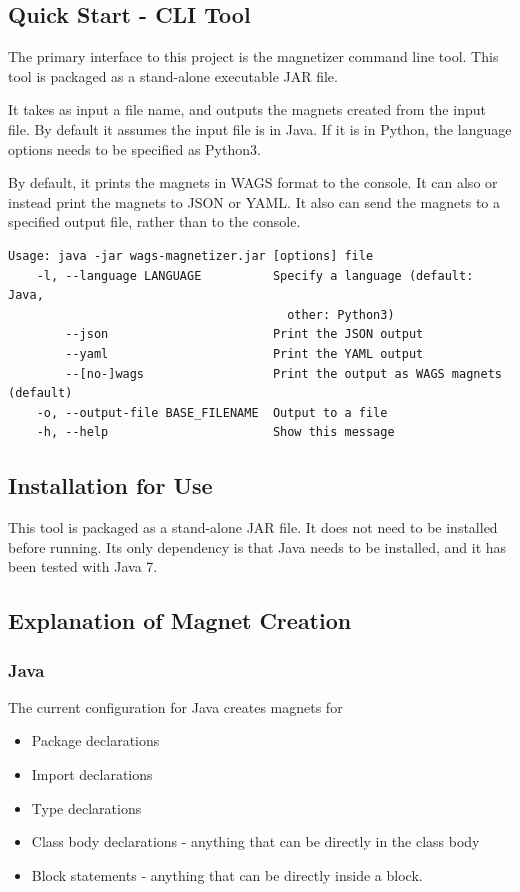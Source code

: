 \documentclass[letter,10pt,final]{article}
\begin{document}
\subsection{Quick Start - CLI Tool}

The primary interface to this project is the magnetizer command line 
tool.  This tool is packaged as a stand-alone executable JAR file. 

It takes as input a file name, and outputs the magnets created 
from the input file. By default it assumes the input file is in Java. 
If it is in Python, the language options needs to be specified as 
Python3. 

By default, it prints the magnets in WAGS format to the console. It can 
also or instead print the magnets to JSON or YAML. It also can 
send the magnets to a specified output file, rather than to the 
console. 

\begin{verbatim}
Usage: java -jar wags-magnetizer.jar [options] file
    -l, --language LANGUAGE          Specify a language (default: Java, 
                                       other: Python3)
        --json                       Print the JSON output
        --yaml                       Print the YAML output
        --[no-]wags                  Print the output as WAGS magnets 
(default)
    -o, --output-file BASE_FILENAME  Output to a file
    -h, --help                       Show this message
\end{verbatim}


\subsection{Installation for Use}
This tool is packaged as a stand-alone JAR file. It does not need to be 
installed before running. Its only dependency is that Java needs to be 
installed, and it has been tested with Java 7.

\subsection{Explanation of Magnet Creation}


\subsubsection{Java}
The current configuration for Java creates magnets for
\begin{itemize}
 \item Package declarations
 \item Import declarations
 \item Type declarations
 \item Class body declarations - anything that can be directly in the 
class body
 \item Block statements - anything that can be directly inside a block.
\end{itemize}
\end{document}
